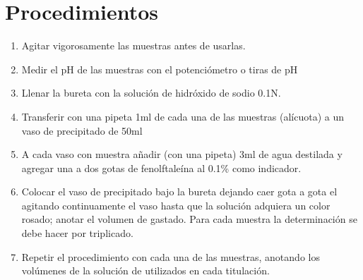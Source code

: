\section{Procedimientos}

\begin{enumerate}
    \item Agitar vigorosamente las muestras antes de usarlas.
    \item Medir el pH de las muestras con el potenciómetro o tiras de pH
    \item Llenar la bureta con la solución de hidróxido de sodio 0.1N.
    \item Transferir con una pipeta 1ml de cada una de las muestras (alícuota) a un vaso de precipitado de 50ml
    \item A cada vaso con muestra añadir (con una pipeta) 3ml de agua destilada y agregar una a dos gotas de fenolftaleína al 0.1\% como indicador.
    \item Colocar el vaso de precipitado bajo la bureta dejando caer gota a gota el  agitando continuamente el vaso hasta que la solución adquiera un color rosado; anotar el volumen de  gastado. Para cada muestra la determinación se debe hacer por triplicado. 
    \item Repetir el procedimiento con cada una de las muestras, anotando los volúmenes de la solución de  utilizados en cada titulación.
\end{enumerate}